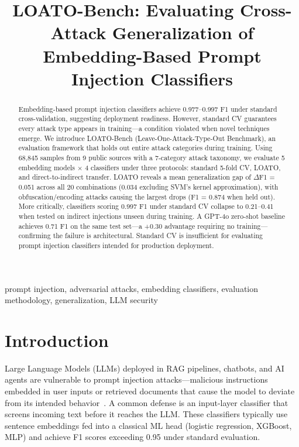 \documentclass[conference]{IEEEtran}
\title{LOATO-Bench: Evaluating Cross-Attack Generalization
       of Embedding-Based Prompt Injection Classifiers}
\author{
\IEEEauthorblockN{Ali Khan}
\IEEEauthorblockA{MS Data Science\\Pace University\\
  \texttt{ak58214n@pace.edu}}
\and
\IEEEauthorblockN{Ahmad Mukhtar}
\IEEEauthorblockA{MS Data Science\\Pace University\\
  \texttt{am41491n@pace.edu}}
}
\newcommand{\df}{$\Delta$F1}
\newcommand{\Fone}{F1}
\begin{document}
\maketitle

\begin{abstract}
Embedding-based prompt injection classifiers achieve 0.977--0.997 \Fone{} under
standard cross-validation, suggesting deployment readiness. However, standard CV
guarantees every attack type appears in training---a condition violated when
novel techniques emerge. We introduce LOATO-Bench (Leave-One-Attack-Type-Out
Benchmark), an evaluation framework that holds out entire attack categories
during training. Using 68,845 samples from 9 public sources with a 7-category
attack taxonomy, we evaluate 5 embedding models $\times$ 4 classifiers under
three protocols: standard 5-fold CV, LOATO, and direct-to-indirect transfer.
LOATO reveals a mean generalization gap of \df{} = 0.051 across all 20
combinations (0.034 excluding SVM's kernel approximation), with
obfuscation/encoding attacks causing the largest drops (\Fone{} = 0.874 when
held out). More critically, classifiers scoring 0.997 \Fone{} under standard CV
collapse to 0.21--0.41 when tested on indirect injections unseen during
training. A GPT-4o zero-shot baseline achieves 0.71 \Fone{} on the same test
set---a +0.30 advantage requiring no training---confirming the failure is
architectural. Standard CV is insufficient for evaluating prompt injection
classifiers intended for production deployment.
\end{abstract}

\begin{IEEEkeywords}
prompt injection, adversarial attacks, embedding classifiers, evaluation
methodology, generalization, LLM security
\end{IEEEkeywords}

\section{Introduction}
\label{sec:intro}

Large Language Models (LLMs) deployed in RAG pipelines, chatbots, and AI agents
are vulnerable to prompt injection attacks---malicious instructions embedded in
user inputs or retrieved documents that cause the model to deviate from its
intended behavior~\cite{perez2022ignore,greshake2023not}. A common defense is
an input-layer classifier that screens incoming text before it reaches the LLM.
These classifiers typically use sentence embeddings fed into a classical ML head
(logistic regression, XGBoost, MLP) and achieve \Fone{} scores exceeding 0.95
under standard evaluation.
\end{document}
